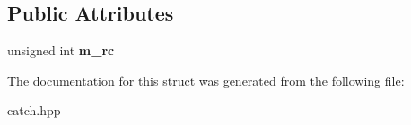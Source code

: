 \subsection*{Public Attributes}
\begin{DoxyCompactItemize}
\item 
\mbox{\label{structCatch_1_1SharedImpl_a7e71ef1985b85aa41a1632f932a96bcb}} 
unsigned int {\bfseries m\+\_\+rc}
\end{DoxyCompactItemize}


The documentation for this struct was generated from the following file\+:\begin{DoxyCompactItemize}
\item 
catch.\+hpp\end{DoxyCompactItemize}
